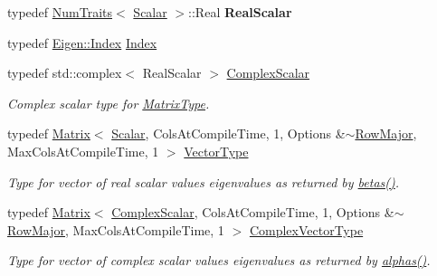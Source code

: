 \begin{DoxyCompactItemize}
\mbox{\label{group___eigenvalues___module_a2fb7acd2ce5c1e73025a1d2d4bb27107}} 
typedef \hyperlink{group___core___module_struct_eigen_1_1_num_traits}{Num\+Traits}$<$ \hyperlink{group___eigenvalues___module_afb318d0b097ff8dd5a7410d31317ca47}{Scalar} $>$\+::Real {\bfseries Real\+Scalar}
\item 
typedef \hyperlink{namespace_eigen_a62e77e0933482dafde8fe197d9a2cfde}{Eigen\+::\+Index} \hyperlink{group___eigenvalues___module_a46a0ff3841059479ec314e56a5645302}{Index}
\item 
typedef std\+::complex$<$ Real\+Scalar $>$ \hyperlink{group___eigenvalues___module_abdec07af91db1345bb4c74066e3d0ea7}{Complex\+Scalar}
\begin{DoxyCompactList}\small\item\em Complex scalar type for \hyperlink{group___eigenvalues___module_a56f4b9823bb9a267de3aaf48428cd247}{Matrix\+Type}. \end{DoxyCompactList}\item 
typedef \hyperlink{group___core___module_class_eigen_1_1_matrix}{Matrix}$<$ \hyperlink{group___eigenvalues___module_afb318d0b097ff8dd5a7410d31317ca47}{Scalar}, Cols\+At\+Compile\+Time, 1, Options \&$\sim$\hyperlink{group__enums_ggaacded1a18ae58b0f554751f6cdf9eb13acfcde9cd8677c5f7caf6bd603666aae3}{Row\+Major}, Max\+Cols\+At\+Compile\+Time, 1 $>$ \hyperlink{group___eigenvalues___module_a5aa3d1390c2b0d455c1c9b8b3101b119}{Vector\+Type}
\begin{DoxyCompactList}\small\item\em Type for vector of real scalar values eigenvalues as returned by \hyperlink{group___eigenvalues___module_abeaa6f56cee367b83fd09d428462ca0c}{betas()}. \end{DoxyCompactList}\item 
typedef \hyperlink{group___core___module_class_eigen_1_1_matrix}{Matrix}$<$ \hyperlink{group___eigenvalues___module_abdec07af91db1345bb4c74066e3d0ea7}{Complex\+Scalar}, Cols\+At\+Compile\+Time, 1, Options \&$\sim$\hyperlink{group__enums_ggaacded1a18ae58b0f554751f6cdf9eb13acfcde9cd8677c5f7caf6bd603666aae3}{Row\+Major}, Max\+Cols\+At\+Compile\+Time, 1 $>$ \hyperlink{group___eigenvalues___module_acfd144329aca76882069da2fc5d53ef5}{Complex\+Vector\+Type}
\begin{DoxyCompactList}\small\item\em Type for vector of complex scalar values eigenvalues as returned by \hyperlink{group___eigenvalues___module_a82b1bc41267f46e5c5899d5b084a73bb}{alphas()}. \end{DoxyCompactList}\item 

\end{DoxyCompactItemize}
